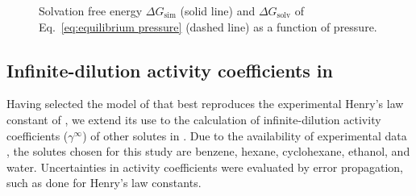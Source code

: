 \documentclass[3p,twocolumn]{elsarticle}
\begin{document}
\begin{figure}
	\centering
	
	\caption{Solvation free energy $\Delta G_\text{sim}$ (solid line) and $\Delta G_\text{solv}$ of Eq.~\eqref{eq:equilibrium pressure} (dashed line) as a function of pressure.}
	\label{fig:pressure}
\end{figure}


\subsection{Infinite-dilution activity coefficients in \ce{[emim][B(CN)_4]}}
\label{sec:act_results}

Having selected the model of \ce{[emim][B(CN)_4]} that best reproduces the experimental Henry's law constant of , we extend its use to the calculation of infinite-dilution activity coefficients ($\gamma^\infty$) of other solutes in \ce{[emim][B(CN)_4]}.
Due to the availability of experimental data \cite{Yan_2010, Doma_ska_2011}, the solutes chosen for this study are benzene, hexane, cyclohexane, ethanol, and water. Uncertainties in activity coefficients were evaluated by error propagation, such as done for Henry's law constants.
\end{document}
